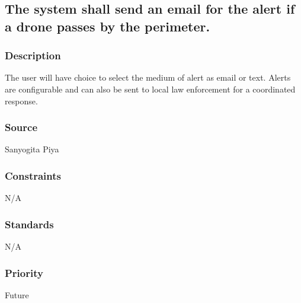 \subsection{The system shall send an email for the alert if a drone passes by the perimeter.}
\subsubsection{Description}
The user will have choice to select the medium of alert as email or text. Alerts are configurable and can also be sent to local law enforcement for a coordinated response.
\subsubsection{Source}
Sanyogita Piya
\subsubsection{Constraints}
N/A
\subsubsection{Standards}
N/A
\subsubsection{Priority}
Future
